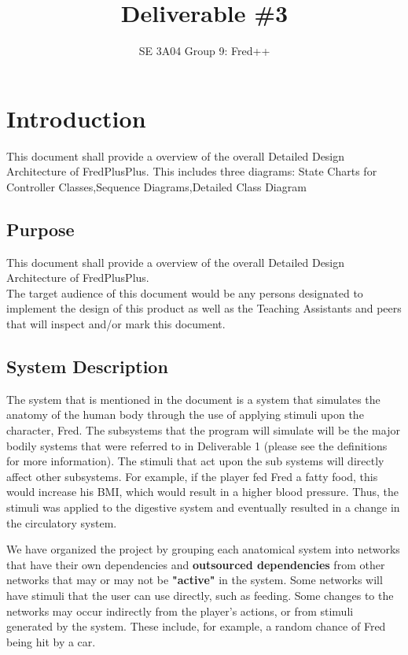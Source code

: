 \documentclass[]{article}
\title{Deliverable \#3}
\author{SE 3A04 Group 9: Fred++}
\date{}
\begin{document}
\maketitle	

\section{Introduction}
\label{sec:introduction}


This document shall provide a overview of the overall Detailed Design Architecture of FredPlusPlus. This includes three diagrams: State Charts for Controller Classes,Sequence Diagrams,Detailed Class Diagram



\subsection{Purpose}
\label{sub:purpose}

This document shall provide a overview of the overall Detailed Design Architecture of FredPlusPlus.\\
The target audience of this document would be any persons designated to implement the design of this product as well as the Teaching Assistants and peers that will
inspect and/or mark this document.

\subsection{System Description}
\label{sub:system_description}
The system that is mentioned in the document is a system that simulates the anatomy of the human body through the use of applying stimuli upon the character, Fred. The subsystems that the program will simulate will be the major bodily systems that were referred to in Deliverable 1 (please see the definitions for more information). The stimuli that act upon the sub systems will directly affect other subsystems. For example, if the player fed Fred a fatty food, this would increase his BMI, which would result in a higher blood pressure. Thus, the stimuli was applied to the digestive system and eventually resulted in a change in the circulatory system.
	
We have organized the project by grouping each anatomical system into networks that have their own dependencies and \textbf{outsourced dependencies} from other networks that may or may not be \textbf{"active"} in the system. Some networks will have stimuli that
the user can use directly, such as feeding. Some changes to the networks may occur indirectly from the player's actions, or from stimuli generated by the system. These include, for example, a random chance of Fred being hit by a car.
\end{document}
